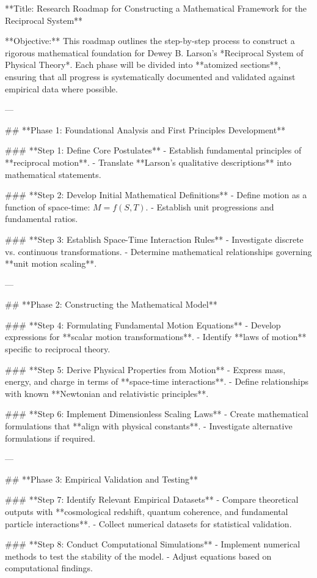 **Title: Research Roadmap for Constructing a Mathematical Framework for the Reciprocal System**

**Objective:**
This roadmap outlines the step-by-step process to construct a rigorous mathematical foundation for Dewey B. Larson’s *Reciprocal System of Physical Theory*. Each phase will be divided into **atomized sections**, ensuring that all progress is systematically documented and validated against empirical data where possible.

---

## **Phase 1: Foundational Analysis and First Principles Development**

### **Step 1: Define Core Postulates**
- Establish fundamental principles of **reciprocal motion**.
- Translate **Larson’s qualitative descriptions** into mathematical statements.

### **Step 2: Develop Initial Mathematical Definitions**
- Define motion as a function of space-time: \( M = f(S, T) \).
- Establish unit progressions and fundamental ratios.

### **Step 3: Establish Space-Time Interaction Rules**
- Investigate discrete vs. continuous transformations.
- Determine mathematical relationships governing **unit motion scaling**.

---

## **Phase 2: Constructing the Mathematical Model**

### **Step 4: Formulating Fundamental Motion Equations**
- Develop expressions for **scalar motion transformations**.
- Identify **laws of motion** specific to reciprocal theory.

### **Step 5: Derive Physical Properties from Motion**
- Express mass, energy, and charge in terms of **space-time interactions**.
- Define relationships with known **Newtonian and relativistic principles**.

### **Step 6: Implement Dimensionless Scaling Laws**
- Create mathematical formulations that **align with physical constants**.
- Investigate alternative formulations if required.

---

## **Phase 3: Empirical Validation and Testing**

### **Step 7: Identify Relevant Empirical Datasets**
- Compare theoretical outputs with **cosmological redshift, quantum coherence, and fundamental particle interactions**.
- Collect numerical datasets for statistical validation.

### **Step 8: Conduct Computational Simulations**
- Implement numerical methods to test the stability of the model.
- Adjust equations based on computational findings.

